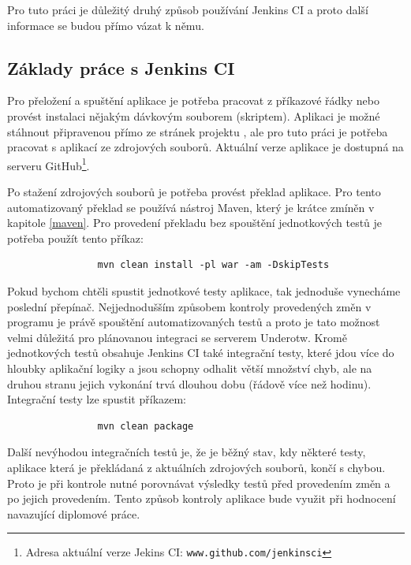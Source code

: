             Pro tuto práci je důležitý druhý způsob používání Jenkins CI a proto další informace se budou přímo vázat k němu.

        \subsection{Základy práce s Jenkins CI} \label{jenkinsUsage}
            Pro přeložení a spuštění aplikace je potřeba pracovat z příkazové řádky nebo provést instalaci nějakým dávkovým souborem (skriptem).
            Aplikaci je možné stáhnout připravenou přímo ze stránek projektu \cite{jenkinsWeb}, ale pro tuto práci je potřeba 
            pracovat s aplikací ze zdrojových souborů. Aktuální verze aplikace je dostupná na serveru 
            GitHub\footnote{Adresa aktuální verze Jekins CI: \texttt{www.github.com/jenkinsci}}.

            Po stažení zdrojových souborů je potřeba provést překlad aplikace. Pro tento automatizovaný překlad se používá nástroj Maven, který
            je krátce zmíněn v kapitole \ref{maven}. Pro provedení překladu bez spouštění jednotkových testů je potřeba použít tento příkaz:
            \begin{verbatim}
                mvn clean install -pl war -am -DskipTests
            \end{verbatim}
            Pokud bychom chtěli spustit jednotkové testy aplikace, tak jednoduše vynecháme poslední přepínač. Nejjednodušším 
            způsobem kontroly provedených změn v programu je právě spouštění automatizovaných testů a proto je tato možnost
            velmi důležitá pro plánovanou integraci se serverem Underotw. Kromě jednotkových testů obsahuje Jenkins CI také
            integrační testy, které jdou více do hloubky aplikační logiky a jsou schopny odhalit větší množství chyb, 
            ale na druhou stranu jejich vykonání trvá dlouhou dobu (řádově více než hodinu). Integrační testy lze spustit
            příkazem:
            \begin{verbatim}
                mvn clean package
            \end{verbatim}
            Další nevýhodou integračních testů je, že je běžný stav, kdy některé testy, aplikace která je překládaná z aktuálních zdrojových souborů,
            končí s chybou. Proto je při kontrole nutné porovnávat výsledky testů před provedením změn a po jejich provedením. Tento způsob
            kontroly aplikace bude využit při hodnocení navazující diplomové práce.

